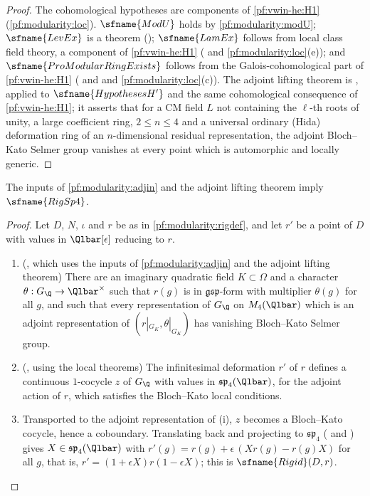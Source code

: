 \begin{proof}
The cohomological hypotheses are components of \ref{pf:vwin-he:H1} (\cref{pf:modularity:loc}). $\sfname{ModU}$ holds by
\cref{pf:modularity:modU}; $\sfname{LevEx}$ is a theorem
(); $\sfname{LamEx}$ follows from local class field theory, a component of \ref{pf:vwin-he:H1}
( and \cref{pf:modularity:loc}(e)); and
$\sfname{ProModularRingExists}$ follows from the Galois-cohomological part of \ref{pf:vwin-he:H1}
( and  and \cref{pf:modularity:loc}(c)). The adjoint lifting
theorem is , applied to $\sfname{HypothesesH'}$ and the
same cohomological consequence of \ref{pf:vwin-he:H1}; it asserts that for a CM field $L$ not containing the $\ell$-th
roots of unity, a large coefficient ring, $2\le n\le4$ and a universal ordinary (Hida) deformation ring of an
$n$-dimensional residual representation, the adjoint Bloch--Kato Selmer group vanishes at every point which is
automorphic and locally generic.
\end{proof}

\begin{theorem}[Rigidity]\label{pf:modularity:rig}
The inputs of \cref{pf:modularity:adjin} and the adjoint lifting theorem imply $\sfname{RigSp4}$.
\end{theorem}

\begin{proof}
Let $D$, $N$, $\iota$ and $r$ be as in \cref{pf:modularity:rigdef}, and let $r'$ be a point of $D$ with values in
$\Qlbar[\epsilon]$ reducing to $r$.
\begin{enumerate}[label=(\roman*)]
\item (, which uses the inputs of \cref{pf:modularity:adjin}
and the adjoint lifting theorem) There are an imaginary quadratic field $K\subset\Omega$ and a character
$\theta:G_\Q\to\Qlbar^\times$ such that $r(g)$ is in $\mathfrak{gsp}$-form with multiplier $\theta(g)$ for all $g$, and such
that every representation of $G_\Q$ on $M_4(\Qlbar)$ which is an adjoint representation of
$(r|_{G_K},\theta|_{G_K})$ has vanishing Bloch--Kato Selmer group.
\item (, using the local theorems) The infinitesimal
deformation $r'$ of $r$ defines a continuous $1$-cocycle $z$ of $G_\Q$ with values in $\mathfrak{sp}_4(\Qlbar)$, for the
adjoint action of $r$, which satisfies the Bloch--Kato local conditions.
\item Transported to the adjoint representation of (i), $z$ becomes a Bloch--Kato cocycle, hence a coboundary.
Translating back and projecting to $\mathfrak{sp}_4$ ( and ) gives $X\in\mathfrak{sp}_4(\Qlbar)$
with $r'(g)=r(g)+\epsilon\,(Xr(g)-r(g)X)$ for all $g$, that is, $r'=(1+\epsilon X)r(1-\epsilon X)$; this is
$\sfname{Rigid}(D,r)$.
\end{enumerate}
\end{proof}

